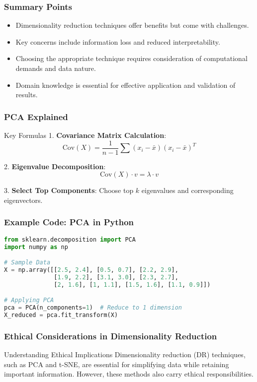 \documentclass[aspectratio=169]{beamer}
\begin{document}
\begin{frame}[fragile]
  \frametitle{Summary Points}
  \begin{itemize}
    \item Dimensionality reduction techniques offer benefits but come with challenges.
    \item Key concerns include information loss and reduced interpretability.
    \item Choosing the appropriate technique requires consideration of computational demands and data nature.
    \item Domain knowledge is essential for effective application and validation of results.
  \end{itemize}
\end{frame}

\begin{frame}[fragile]
  \frametitle{PCA Explained}
  \begin{block}{Key Formulas}
    1. \textbf{Covariance Matrix Calculation}:
    \[
    \text{Cov}(X) = \frac{1}{n-1} \sum (x_i - \bar{x})(x_i - \bar{x})^T
    \]

    2. \textbf{Eigenvalue Decomposition}:
    \[
    \text{Cov}(X) \cdot v = \lambda \cdot v
    \]

    3. \textbf{Select Top Components}: Choose top $k$ eigenvalues and corresponding eigenvectors.
  \end{block}
\end{frame}

\begin{frame}[fragile]
  \frametitle{Example Code: PCA in Python}
  \begin{lstlisting}[language=Python]
from sklearn.decomposition import PCA
import numpy as np

# Sample Data
X = np.array([[2.5, 2.4], [0.5, 0.7], [2.2, 2.9],
              [1.9, 2.2], [3.1, 3.0], [2.3, 2.7],
              [2, 1.6], [1, 1.1], [1.5, 1.6], [1.1, 0.9]])

# Applying PCA
pca = PCA(n_components=1)  # Reduce to 1 dimension
X_reduced = pca.fit_transform(X)
  \end{lstlisting}
\end{frame}

\begin{frame}[fragile]
  \frametitle{Ethical Considerations in Dimensionality Reduction}
  \begin{block}{Understanding Ethical Implications}
    Dimensionality reduction (DR) techniques, such as PCA and t-SNE, are essential for simplifying data while retaining important information. However, these methods also carry ethical responsibilities.
  \end{block}
\end{frame}
\end{document}
